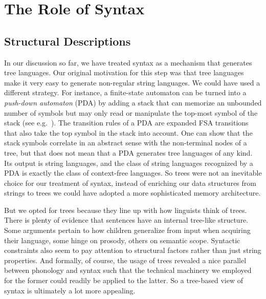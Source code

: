 \section{The Role of Syntax}

\subsection{Structural Descriptions}
In our discussion so far, we have treated syntax as a mechanism that generates tree languages.
Our original motivation for this step was that tree languages make it very easy to generate non-regular string languages.
We could have used a different strategy.
For instance, a finite-state automaton can be turned into a \emph{push-down automaton} (PDA) by adding a stack that can memorize an unbounded number of symbols but may only read or manipulate the top-most symbol of the stack (see e.g.\ \citealt{Sipser05}).
The transition rules of a PDA are expanded FSA transitions that also take the top symbol in the stack into account.
One can show that the stack symbols correlate in an abstract sense with the non-terminal nodes of a tree, but that does not mean that a PDA generates tree languages of any kind.
Its output is string languages, and the class of string languages recognized by a PDA is exactly the class of context-free languages.
So trees were not an inevitable choice for our treatment of syntax, instead of enriching our data structures from strings to trees we could have adopted a more sophisticated memory architecture.

But we opted for trees because they line up with how linguists think of trees.
There is plenty of evidence that sentences have an internal tree-like structure.
Some arguments pertain to how children generalize from input when acquiring their language, some hinge on prosody, others on semantic scope.
Syntactic constraints also seem to pay attention to structural factors rather than just string properties. 
And formally, of course, the usage of trees revealed a nice parallel between phonology and syntax such that the technical machinery we employed for the former could readily be applied to the latter.
So a tree-based view of syntax is ultimately a lot more appealing.

